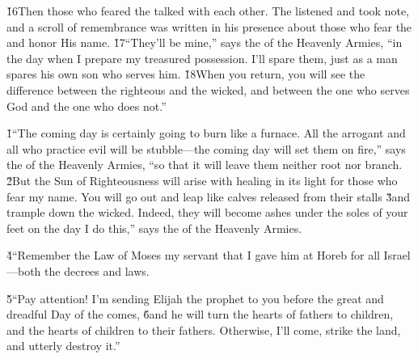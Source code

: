 \v{16}Then those who feared the  talked with each other. The  listened and took note, and a scroll of remembrance was written in his presence about those who fear the  and honor His name. \v{17}``They'll be mine,'' says the  of the Heavenly Armies, ``in the day when I prepare my treasured possession. I'll spare them, just as a man spares his own son who serves him. \v{18}When you return, you will see the difference between the righteous and the wicked, and between the one who serves God and the one who does not.''

\v{1}``The coming day is certainly going to burn like a furnace. All the arrogant and all who practice evil will be stubble---the coming day will set them on fire,'' says the  of the Heavenly Armies, ``so that it will leave them neither root nor branch. \v{2}But the Sun of Righteousness will arise with healing in its light for those who fear my name. You will go out and leap like calves released from their stalls \v{3}and trample down the wicked. Indeed, they will become ashes under the soles of your feet on the day I do this,'' says the  of the Heavenly Armies.

\v{4}``Remember the Law of Moses my servant that I gave him at Horeb for all Israel---both the decrees and laws.

\v{5}``Pay attention! I'm sending Elijah the prophet to you before the great and dreadful Day of the  comes, \v{6}and he will turn the hearts of fathers to children, and the hearts of children to their fathers. Otherwise, I'll come, strike the land, and utterly destroy it.''
